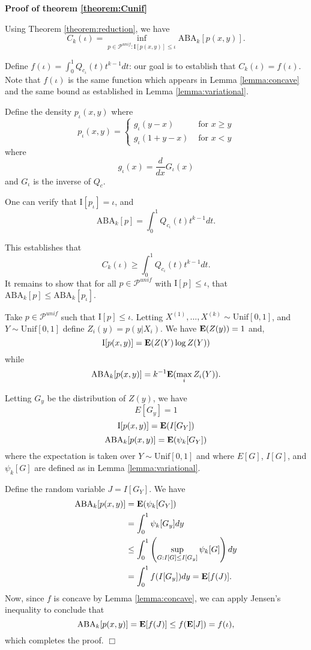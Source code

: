 \textbf{Proof of theorem \ref{theorem:Cunif}}

Using Theorem \ref{theorem:reduction}, we have
\[
C_k(\iota) = \inf_{p \in \mathcal{P}^{unif}: \text{I}[p(x,y)] \leq \iota} \text{ABA}_k[p(x,y)].
\]

Define $f(\iota) = \int_0^1 Q_{c_\iota}(t) t^{k-1} dt$: our goal is to
establish that $C_k(\iota) = f(\iota)$.  
Note that $f(\iota)$
is the same function which appears in Lemma \ref{lemma:concave} and
the same bound as established in Lemma \ref{lemma:variational}.

Define the density $p_\iota(x, y)$ where
\[
p_\iota(x, y) = \begin{cases}
g_\iota(y - x) & \text{ for } x\geq y\\
g_\iota(1 + y - x) & \text{ for } x < y
\end{cases}
\]
where
\[
g_\iota(x) = \frac{d}{dx}G_\iota(x)
\]
and $G_\iota$ is the inverse of $Q_c$.

One can verify that $\text{I}[p_\iota] = \iota$, and 
\[
\text{ABA}_k[p] = \int_0^1 Q_{c_\iota}(t) t^{k-1} dt.
\]

This establishes that
\[
C_k(\iota) \geq \int_0^1 Q_{c_\iota}(t) t^{k-1} dt.
\]
It remains to show that for all $p \in \mathcal{P}^{unif}$ with
$\text{I}[p] \leq \iota$, that $\text{ABA}_k[p] \leq \text{ABA}_k[p_\iota]$.

Take $p \in \mathcal{P}^{unif}$ such that $\text{I}[p] \leq \iota$.
Letting $X^{(1)},...,X^{(k)} \sim \text{Unif}[0,1]$, and $Y \sim \text{Unif}[0,1]$ define $Z_i(y) = p(y|X_i)$.
We have $\textbf{E}(Z(y)) = 1$ and,
\[
\text{I}[p(x,y)] = \textbf{E}(Z(Y) \log Z(Y))
\]
while
\[
\text{ABA}_k[p(x,y)] = k^{-1}\textbf{E}(\max_i Z_i(Y)).
\]

Letting $G_y$ be the distribution of $Z(y)$, we have
\[
E[G_y] = 1
\]
\[
\text{I}[p(x,y)] = \textbf{E}(I[G_Y])
\]
\[
\text{ABA}_k[p(x,y)] = \textbf{E}(\psi_k[G_Y])
\]
where the expectation is taken over $Y \sim \text{Unif}[0,1]$ and
where $E[G]$, $I[G]$, and $\psi_k[G]$ are defined as in
Lemma \ref{lemma:variational}.

Define the random variable $J = I[G_Y]$.
We have
\begin{align*}
\text{ABA}_k[p(x,y)] &= \textbf{E}(\psi_k[G_Y])
\\&= \int_0^1 \psi_k[G_y] dy
\\&\leq \int_0^1 \left(\sup_{G: I[G] \leq I[G_y]} \psi_k[G]\right) dy
\\&= \int_0^1 f(I[G_y]) dy = \textbf{E}[f(J)].
\end{align*}
Now, since $f$ is concave by Lemma \ref{lemma:concave},
we can apply Jensen's inequality to conclude that
\[
\text{ABA}_k[p(x,y)] = \textbf{E}[f(J)] \leq f(\textbf{E}[J]) = f(\iota),
\]
which completes the proof. $\Box$




